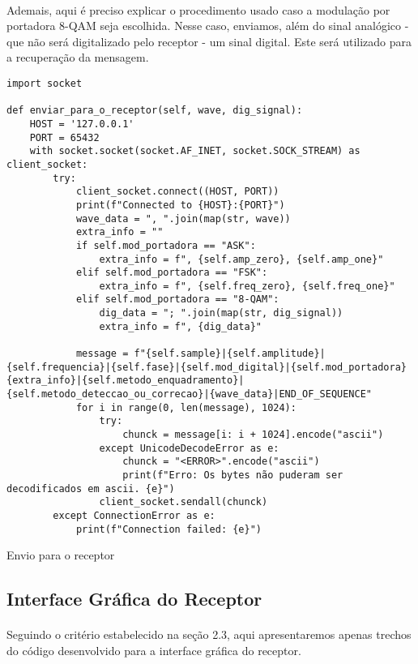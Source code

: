\documentclass[12pt, a4paper]{article}
\newenvironment{code}{\captionsetup{type=listing}}{}
\begin{document}
\paragraph{}
Ademais, aqui é preciso explicar o procedimento usado caso a modulação por portadora 8-QAM seja escolhida. Nesse caso, enviamos, além do sinal analógico - que não será digitalizado pelo receptor - um sinal digital. Este será utilizado para a recuperação da mensagem.

\begin{code}
\begin{verbatim}
import socket

def enviar_para_o_receptor(self, wave, dig_signal):
    HOST = '127.0.0.1'
    PORT = 65432
    with socket.socket(socket.AF_INET, socket.SOCK_STREAM) as client_socket:
        try:
            client_socket.connect((HOST, PORT))
            print(f"Connected to {HOST}:{PORT}")
            wave_data = ", ".join(map(str, wave))
            extra_info = ""
            if self.mod_portadora == "ASK":
                extra_info = f", {self.amp_zero}, {self.amp_one}" 
            elif self.mod_portadora == "FSK":
                extra_info = f", {self.freq_zero}, {self.freq_one}"
            elif self.mod_portadora == "8-QAM":
                dig_data = "; ".join(map(str, dig_signal))
                extra_info = f", {dig_data}"
                
            message = f"{self.sample}|{self.amplitude}|{self.frequencia}|{self.fase}|{self.mod_digital}|{self.mod_portadora}{extra_info}|{self.metodo_enquadramento}|{self.metodo_deteccao_ou_correcao}|{wave_data}|END_OF_SEQUENCE"
            for i in range(0, len(message), 1024):
                try:
                    chunck = message[i: i + 1024].encode("ascii")
                except UnicodeDecodeError as e:
                    chunck = "<ERROR>".encode("ascii")
                    print(f"Erro: Os bytes não puderam ser decodificados em ascii. {e}")
                client_socket.sendall(chunck)
        except ConnectionError as e:
            print(f"Connection failed: {e}")
\end{verbatim}
\caption{Envio para o receptor}
\end{code}

\subsection{Interface Gráfica do Receptor}
\paragraph{}
Seguindo o critério estabelecido na seção 2.3, aqui apresentaremos apenas trechos do código desenvolvido para a interface gráfica do receptor.
\end{document}
